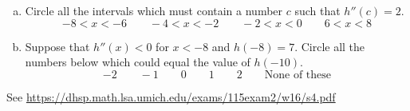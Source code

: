 \documentclass[11pt]{exam}
\begin{document}
\begin{questions}
\begin{enumerate}[(a)]
\item Circle all the intervals which must contain a number $c$ such that $h''(c)=2$.
$$-8 < x < -6 \qquad -4 < x < -2 \qquad -2 < x < 0 \qquad 6 < x < 8$$
\item Suppose that $h''(x)<0$ for $x<-8$ and $h(-8)=7$. Circle all the numbers below which could equal the value of $h(-10)$.
$$-2 \qquad -1 \qquad 0 \qquad 1 \qquad 2  \qquad \textrm{None of these}$$
\end{enumerate}
\begin{solution}
  See \href{https://dhsp.math.lsa.umich.edu/exams/115exam2/w16/s4.pdf}{https://dhsp.math.lsa.umich.edu/exams/115exam2/w16/s4.pdf} 
\end{solution}
\end{questions}
\end{document}
